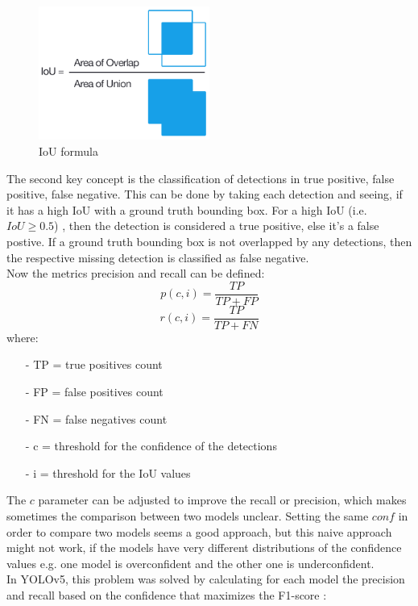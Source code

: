 \begin{figure}[!hb]

  \includegraphics[width=0.5\textwidth]{images/iou}
  \centering
  \caption{IoU formula \cite{map_tutorial}}
  \label{fig:iou}
\end{figure}

The second key concept is the classification of detections in true positive, false positive, false negative. This can be done by taking each detection and seeing, if it has a high IoU with a ground truth bounding box. For a high IoU (i.e. $IoU \geq 0.5$) , then the detection is considered a true positive, else it's a false postive. If a ground truth bounding box is not overlapped by any detections, then the respective missing detection is classified as false negative.\\
Now the metrics precision and recall can be defined:
\begin{equation}
p(c,i) = \frac{TP}{TP + FP}
\end{equation}
\begin{equation}
r(c,i) = \frac{TP}{TP + FN}
\end{equation}
where:
\begin{itemize}
\item[-]{TP = true positives count}
\item[-]{FP = false positives count}
\item[-]{FN = false negatives count}
\item[-]{c = threshold for the confidence of the detections}
\item[-]{i = threshold for the IoU values}
\end{itemize}

The $c$ parameter can be adjusted to improve the recall or precision, which makes sometimes the comparison between two models unclear. Setting the same $conf$ in order to compare two models seems a good approach, but this naive approach might not work, if the models have very different distributions of the confidence values e.g. one model is overconfident and the other one is underconfident. \\
In YOLOv5, this problem was solved by calculating for each model the precision and recall based on the confidence that maximizes the F1-score  \cite{yolov5_conf}:

